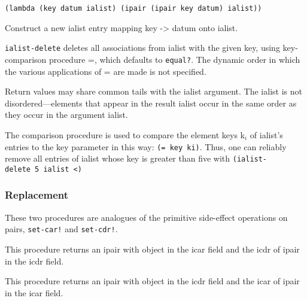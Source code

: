 \begin{entry}{%
  }

\begin{verbatim}
(lambda (key datum ialist) (ipair (ipair key datum) ialist))
\end{verbatim}

  Construct a new ialist entry mapping key -\textgreater{} datum onto
  ialist.
\end{entry}
\begin{entry}{%
  }

  \texttt{ialist-delete} deletes all associations from ialist
  with the given key, using key-comparison procedure =, which defaults
  to \texttt{equal?}. The dynamic order in which the various
  applications of = are made is not specified.

  Return values may share common tails with the ialist argument. The
  ialist is not disordered---elements that appear in the result
  ialist occur in the same order as they occur in the argument ialist.

  The comparison procedure is used to compare the element keys k$_i$
  of ialist's entries to the key parameter in this way: \texttt{(=\
    key\ ki)}. Thus, one can reliably remove all entries of ialist
  whose key is greater than five with \texttt{(ialist-delete\ 5\
    ialist\ \textless{})}
\end{entry}

\subsubsection{{Replacement}}

These two procedures are analogues of the primitive side-effect
operations on pairs, \texttt{set-car!} and \texttt{set-cdr!}.

\begin{entry}{%
  }

  This
  procedure returns an ipair with object in the icar field and the
  icdr of ipair in the icdr field.
\end{entry}

\begin{entry}{%
  }

  This
  procedure returns an ipair with object in the icdr field and the
  icar of ipair in the icar field.
\end{entry}

